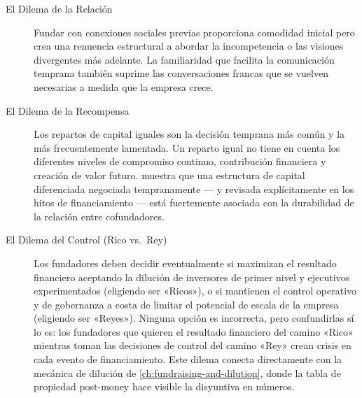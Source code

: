 \begin{description}
  \item[El Dilema de la Relación] Fundar con conexiones sociales previas proporciona comodidad
    inicial pero crea una renuencia estructural a abordar la incompetencia o las visiones
    divergentes más adelante. La familiaridad que facilita la comunicación temprana también
    suprime las conversaciones francas que se vuelven necesarias a medida que la empresa crece.
  \item[El Dilema de la Recompensa] Los repartos de capital iguales son la decisión temprana más
    común y la más frecuentemente lamentada. Un reparto igual no tiene en cuenta los diferentes
    niveles de compromiso continuo, contribución financiera y creación de valor futuro.
    \textcite{wasserman2012founders} muestra que una estructura de capital diferenciada negociada
    tempranamente --- y revisada explícitamente en los hitos de financiamiento --- está fuertemente
    asociada con la durabilidad de la relación entre cofundadores.
  \item[El Dilema del Control (Rico vs.\ Rey)] Los fundadores deben decidir eventualmente si
    maximizan el resultado financiero aceptando la dilución de inversores de primer nivel y
    ejecutivos experimentados (eligiendo ser «Ricos»), o si mantienen el control operativo y de
    gobernanza a costa de limitar el potencial de escala de la empresa (eligiendo ser «Reyes»).
    Ninguna opción es incorrecta, pero confundirlas sí lo es: los fundadores que quieren el
    resultado financiero del camino «Rico» mientras toman las decisiones de control del camino
    «Rey» crean crisis en cada evento de financiamiento. Este dilema conecta directamente con la
    mecánica de dilución de \cref{ch:fundraising-and-dilution}, donde la tabla de propiedad
    post-money hace visible la disyuntiva en números.
\end{description}

